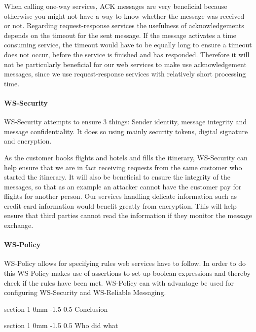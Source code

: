 \documentclass[english, a4paper, 12pt]{article}
\makeatletter
\renewcommand{\section}{\@startsection
{section}%
{1}%
{0mm}%
{-1.5\baselineskip}%
{0.5\baselineskip}%
{\normalfont\Large\bfseries}} %
\makeatother
\begin{document}
When calling one-way services, ACK messages are very beneficial because otherwise you might not have a way to know whether the message was received or not. Regarding request-response services the usefulness of acknowledgements depends on the timeout for the sent message. If the message activates a time consuming service, the timeout would have to be equally long to ensure a timeout does not occur, before the service is finished and has responded.
Therefore it will not be particularly beneficial for our web services to make use acknowledgement messages, since we use request-response services with relatively short processing time.

\paragraph{WS-Security}
WS-Security attempts to ensure 3 things: Sender identity, message integrity and message confidentiality. It does so using mainly security tokens, digital signature and encryption.

As the customer books flights and hotels and fills the itinerary, WS-Security can help ensure that we are in fact receiving requests from the same customer who started the itinerary.
It will also be beneficial to ensure the integrity of the messages, so that as an example an attacker cannot have the customer pay for flights for another person.
Our services handling delicate information such as credit card information would benefit greatly from encryption. This will help ensure that third parties cannot read the information if they monitor the message exchange.

\paragraph{WS-Policy}
WS-Policy allows for specifying rules web services have to follow. In order to do this WS-Policy makes use of assertions to set up boolean expressions and thereby check if the rules have been met. WS-Policy can with advantage be used for configuring WS-Security and WS-Reliable Messaging.



\section{Conclusion}


\section{Who did what}
\end{document}
